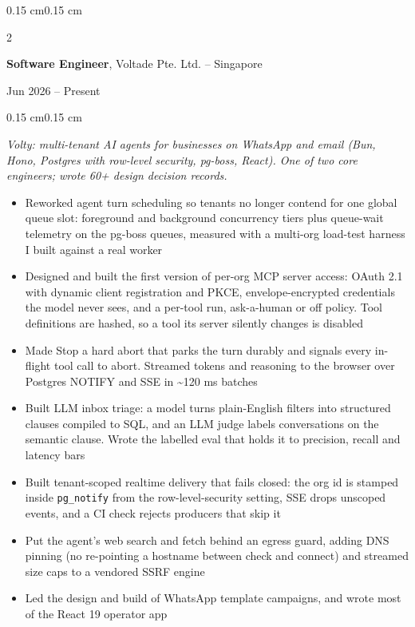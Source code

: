 \documentclass[10pt, letterpaper]{article}
\newenvironment{highlights}{
    \begin{itemize}[
        topsep=0.08 cm,
        parsep=0.05 cm,
        partopsep=0pt,
        itemsep=0pt,
        leftmargin=0.4 cm
    ]
}{
    \end{itemize}
}
\newenvironment{onecolentry}{
    \begin{adjustwidth}{0.15 cm}{0.15 cm}
}{
    \end{adjustwidth}
}
\newenvironment{twocolentry}[2][]{
    \onecolentry
    \def\secondColumn{#2}
    \setcolumnwidth{\fill, 4.5 cm}
    \begin{paracol}{2}
}{
    \switchcolumn \raggedleft \secondColumn
    \end{paracol}
    \endonecolentry
}
\begin{document}
        \begin{twocolentry}{
            Jun 2026 -- Present
        }
            \textbf{Software Engineer}, Voltade Pte. Ltd. -- Singapore
        \end{twocolentry}
        \vspace{0.08 cm}
        \begin{onecolentry}
            \textit{Volty: multi-tenant AI agents for businesses on WhatsApp and email (Bun, Hono, Postgres with row-level security, pg-boss, React). One of two core engineers; wrote 60+ design decision records.}
            \begin{highlights}
                \item Reworked agent turn scheduling so tenants no longer contend for one global queue slot: foreground and background concurrency tiers plus queue-wait telemetry on the pg-boss queues, measured with a multi-org load-test harness I built against a real worker
                \item Designed and built the first version of per-org MCP server access: OAuth 2.1 with dynamic client registration and PKCE, envelope-encrypted credentials the model never sees, and a per-tool run, ask-a-human or off policy. Tool definitions are hashed, so a tool its server silently changes is disabled
                \item Made Stop a hard abort that parks the turn durably and signals every in-flight tool call to abort. Streamed tokens and reasoning to the browser over Postgres NOTIFY and SSE in \textasciitilde120 ms batches
                \item Built LLM inbox triage: a model turns plain-English filters into structured clauses compiled to SQL, and an LLM judge labels conversations on the semantic clause. Wrote the labelled eval that holds it to precision, recall and latency bars
                \item Built tenant-scoped realtime delivery that fails closed: the org id is stamped inside \texttt{pg\_notify} from the row-level-security setting, SSE drops unscoped events, and a CI check rejects producers that skip it
                \item Put the agent's web search and fetch behind an egress guard, adding DNS pinning (no re-pointing a hostname between check and connect) and streamed size caps to a vendored SSRF engine
                \item Led the design and build of WhatsApp template campaigns, and wrote most of the React 19 operator app
            \end{highlights}
        \end{onecolentry}
\end{document}

